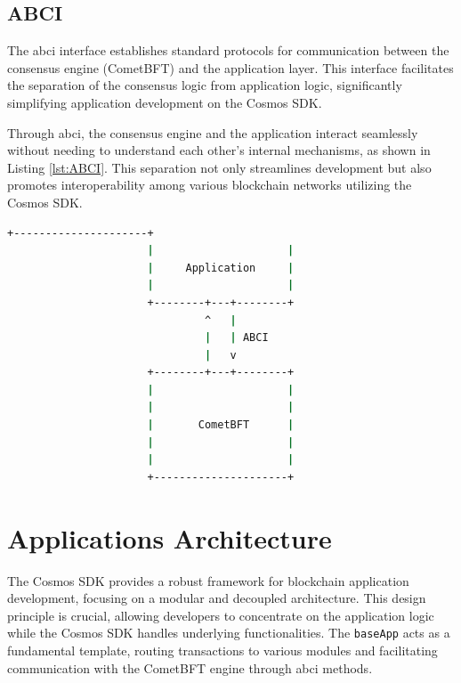 \subsection{ABCI}

The \gls{abci} interface establishes standard protocols for communication between the consensus engine (CometBFT) and the application layer. This interface facilitates the separation of the consensus logic from application logic, significantly simplifying application development on the Cosmos SDK.

Through \gls{abci}, the consensus engine and the application interact seamlessly without needing to understand each other's internal mechanisms, as shown in Listing \ref{lst:ABCI}. This separation not only streamlines development but also promotes interoperability among various blockchain networks utilizing the Cosmos SDK.

\newpage
\begin{lstlisting}[language=bash, caption=ABCI Interface. Source:\cite{app-based-blockchain},label={lst:ABCI}]
                      +---------------------+
                      |                     |
                      |     Application     |
                      |                     |
                      +--------+---+--------+
                               ^   |
                               |   | ABCI
                               |   v
                      +--------+---+--------+
                      |                     |
                      |                     |
                      |       CometBFT      |
                      |                     |
                      |                     |
                      +---------------------+
\end{lstlisting}

\section{Applications Architecture}
\label{ch:applicatoins-architecture}

The Cosmos SDK provides a robust framework for blockchain application development, focusing on a modular and decoupled architecture. This design principle is crucial, allowing developers to concentrate on the application logic while the Cosmos SDK handles underlying functionalities. The \texttt{baseApp} acts as a fundamental template, routing transactions to various modules and facilitating communication with the CometBFT engine through \gls{abci} methods.

